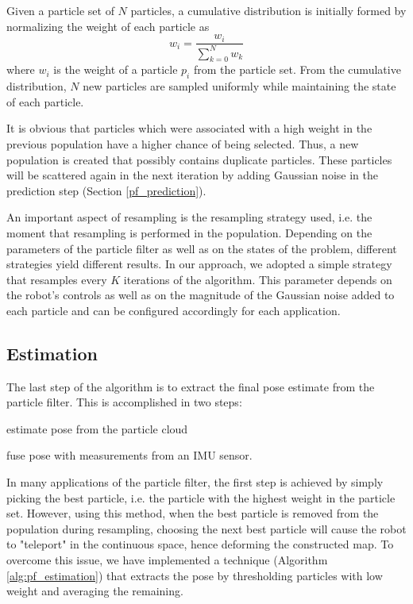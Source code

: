 Given a particle set of $N$ particles, a cumulative distribution is
initially formed by normalizing the weight of each particle as
\begin{equation}
    w_i = \frac{w_i}{\sum\limits_{k=0}^N w_k}
\end{equation}
where $w_i$ is the weight of a particle $p_i$ from the particle set.
From the cumulative distribution, $N$ new particles are sampled
uniformly while maintaining the state of each particle.

It is obvious that particles which were associated with a high
weight in the previous population have a higher chance of being selected.
Thus, a new population is created that possibly contains duplicate
particles.
These particles will be scattered again in the next iteration by
adding Gaussian noise in the prediction step (Section \ref{pf_prediction}).

An important aspect of resampling is the resampling strategy used,
i.e. the moment that resampling is performed in the population.
Depending on the parameters of the particle filter as well as on the
states of the problem, different strategies yield different results.
In our approach, we adopted a simple strategy that resamples every
$K$ iterations of the algorithm.
This parameter depends on the robot's controls as well as on the magnitude of
the Gaussian noise added to each particle and can be configured
accordingly for each application.

\subsection{Estimation}

The last step of the algorithm is to extract the final pose estimate from
the particle filter. This is accomplished in two steps:
\begin{enumerate*}[label=(\roman*)]
    \item estimate pose from the particle cloud
    \item fuse pose with measurements from an IMU sensor.
\end{enumerate*}

In many applications of the particle filter, the first step is achieved
by simply picking the best particle, i.e. the particle with the highest
weight in the particle set.
However, using this method, when the best particle is removed from the
population during resampling, choosing the next best particle will cause the
robot to "teleport" in the continuous space, hence deforming the constructed
map.
To overcome this issue, we have implemented a technique
(Algorithm \ref{alg:pf_estimation}) that extracts the pose by thresholding
particles with low weight and averaging the remaining.

